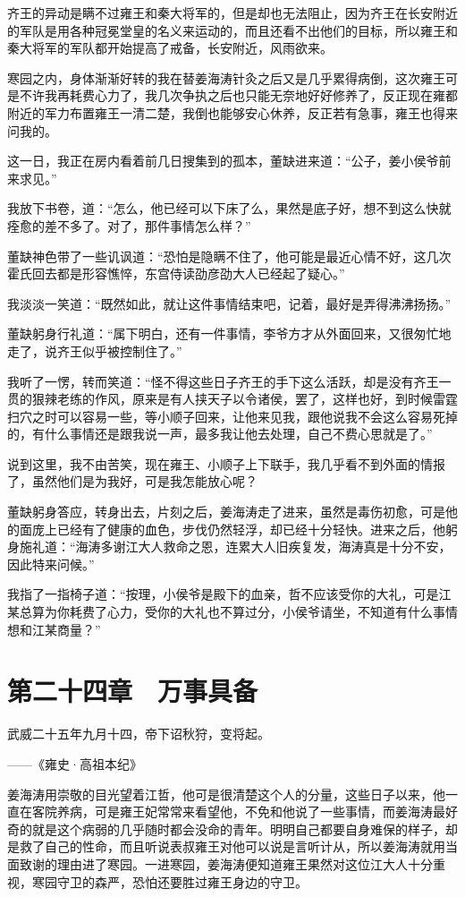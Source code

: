 齐王的异动是瞒不过雍王和秦大将军的，但是却也无法阻止，因为齐王在长安附近的军队是用各种冠冕堂皇的名义来运动的，而且还看不出他们的目标，所以雍王和秦大将军的军队都开始提高了戒备，长安附近，风雨欲来。

寒园之内，身体渐渐好转的我在替姜海涛针灸之后又是几乎累得病倒，这次雍王可是不许我再耗费心力了，我几次争执之后也只能无奈地好好修养了，反正现在雍都附近的军力布置雍王一清二楚，我倒也能够安心休养，反正若有急事，雍王也得来问我的。

这一日，我正在房内看着前几日搜集到的孤本，董缺进来道：“公子，姜小侯爷前来求见。”

我放下书卷，道：“怎么，他已经可以下床了么，果然是底子好，想不到这么快就痊愈的差不多了。对了，那件事情怎么样？”

董缺神色带了一些讥讽道：“恐怕是隐瞒不住了，他可能是最近心情不好，这几次霍氏回去都是形容憔悴，东宫侍读劭彦劭大人已经起了疑心。”

我淡淡一笑道：“既然如此，就让这件事情结束吧，记着，最好是弄得沸沸扬扬。”

董缺躬身行礼道：“属下明白，还有一件事情，李爷方才从外面回来，又很匆忙地走了，说齐王似乎被控制住了。”

我听了一愣，转而笑道：“怪不得这些日子齐王的手下这么活跃，却是没有齐王一贯的狠辣老练的作风，原来是有人挟天子以令诸侯，罢了，这样也好，到时候雷霆扫穴之时可以容易一些，等小顺子回来，让他来见我，跟他说我不会这么容易死掉的，有什么事情还是跟我说一声，最多我让他去处理，自己不费心思就是了。”

说到这里，我不由苦笑，现在雍王、小顺子上下联手，我几乎看不到外面的情报了，虽然他们是为我好，可是我怎能放心呢？

董缺躬身答应，转身出去，片刻之后，姜海涛走了进来，虽然是毒伤初愈，可是他的面庞上已经有了健康的血色，步伐仍然轻浮，却已经十分轻快。进来之后，他躬身施礼道：“海涛多谢江大人救命之恩，连累大人旧疾复发，海涛真是十分不安，因此特来问候。”

我指了一指椅子道：“按理，小侯爷是殿下的血亲，哲不应该受你的大礼，可是江某总算为你耗费了心力，受你的大礼也不算过分，小侯爷请坐，不知道有什么事情想和江某商量？”

\chapter{第二十四章　万事具备}

武威二十五年九月十四，帝下诏秋狩，变将起。

——《雍史·高祖本纪》

姜海涛用崇敬的目光望着江哲，他可是很清楚这个人的分量，这些日子以来，他一直在客院养病，可是雍王妃常常来看望他，不免和他说了一些事情，而姜海涛最好奇的就是这个病弱的几乎随时都会没命的青年。明明自己都要自身难保的样子，却是救了自己的性命，而且听说表叔雍王对他可以说是言听计从，所以姜海涛就用当面致谢的理由进了寒园。一进寒园，姜海涛便知道雍王果然对这位江大人十分重视，寒园守卫的森严，恐怕还要胜过雍王身边的守卫。

